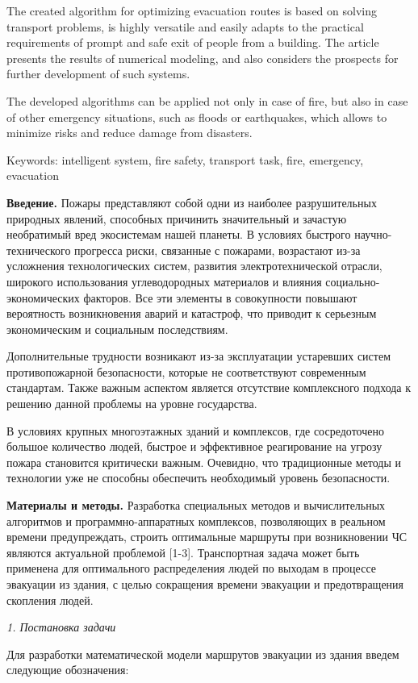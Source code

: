 \documentclass[
]{article}
\begin{document}
The created algorithm for optimizing evacuation routes is based on
solving transport problems, is highly versatile and easily adapts to the
practical requirements of prompt and safe exit of people from a
building. The article presents the results of numerical modeling, and
also considers the prospects for further development of such systems.

The developed algorithms can be applied not only in case of fire, but
also in case of other emergency situations, such as floods or
earthquakes, which allows to minimize risks and reduce damage from
disasters.

Keywords: intelligent system, fire safety, transport task, fire,
emergency, evacuation

\textbf{Введение.} Пожары представляют собой одни из наиболее
разрушительных природных явлений, способных причинить значительный и
зачастую необратимый вред экосистемам нашей планеты. В условиях быстрого
научно-технического прогресса риски, связанные с пожарами, возрастают
из-за усложнения технологических систем, развития электротехнической
отрасли, широкого использования углеводородных материалов и влияния
социально-экономических факторов. Все эти элементы в совокупности
повышают вероятность возникновения аварий и катастроф, что приводит к
серьезным экономическим и социальным последствиям.

Дополнительные трудности возникают из-за эксплуатации устаревших систем
противопожарной безопасности, которые не соответствуют современным
стандартам. Также важным аспектом является отсутствие комплексного
подхода к решению данной проблемы на уровне государства.

В условиях крупных многоэтажных зданий и комплексов, где сосредоточено
большое количество людей, быстрое и эффективное реагирование на угрозу
пожара становится критически важным. Очевидно, что традиционные методы и
технологии уже не способны обеспечить необходимый уровень безопасности.

\textbf{Материалы и методы.} Разработка специальных методов и
вычислительных алгоритмов и программно-аппаратных комплексов,
позволяющих в реальном времени предупреждать, строить оптимальные
маршруты при возникновении ЧС являются актуальной проблемой {[}1-3{]}.
Транспортная задача может быть применена для оптимального распределения
людей по выходам в процессе эвакуации из здания, с целью сокращения
времени эвакуации и предотвращения скопления людей.

\emph{1. Постановка задачи}

Для разработки математической модели маршрутов эвакуации из здания
введем следующие обозначения:
\end{document}
